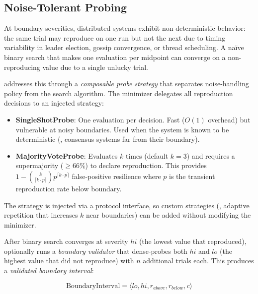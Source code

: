 \subsection{Noise-Tolerant Probing}
\label{sec:probing}

At boundary severities, distributed systems exhibit non-deterministic behavior:
the same trial may reproduce on one run but not the next due to timing
variability in leader election, gossip convergence, or thread scheduling. A
na\"ive binary search that makes one evaluation per midpoint can converge on a
non-reproducing value due to a single unlucky trial.

\system{} addresses this through a \emph{composable probe strategy} that
separates noise-handling policy from the search algorithm. The minimizer
delegates all reproduction decisions to an injected strategy:

\begin{itemize}[leftmargin=*,topsep=2pt,itemsep=1pt]
  \item \textbf{SingleShotProbe}: One evaluation per decision. Fast ($O(1)$
        overhead) but vulnerable at noisy boundaries. Used when the system is
        known to be deterministic (\eg{}, consensus systems far from their
        boundary).
  \item \textbf{MajorityVoteProbe}: Evaluates $k$ times (default $k=3$) and
        requires a supermajority ($\geq 66\%$) to declare reproduction. This
        provides $1 - \binom{k}{\lceil k \cdot p \rceil} p^{\lceil k \cdot p
        \rceil}$ false-positive resilience where $p$ is the transient
        reproduction rate below boundary.
\end{itemize}

The strategy is injected via a protocol interface, so custom strategies
(\eg{}, adaptive repetition that increases $k$ near boundaries) can be added
without modifying the minimizer.

 After binary search converges at
severity $hi$ (the lowest value that reproduced), \system{} optionally runs a
\emph{boundary validator} that dense-probes both $hi$ and $lo$ (the highest
value that did not reproduce) with $n$ additional trials each. This produces a
\emph{validated boundary interval}:

\begin{equation}
\text{BoundaryInterval} = \langle lo, hi, r_{above}, r_{below}, c \rangle
\end{equation}

